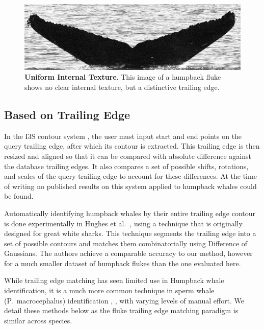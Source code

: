 \begin{figure}[t]%
\centering
\includegraphics[width=1.0\textwidth]{../images/unclear_texture.jpg}
\caption[]{\textbf{Uniform Internal Texture}. This image of a humpback fluke shows no clear internal texture, but a distinctive trailing edge.}
\label{fig:unclear_texture}
\end{figure}



\subsection{Based on Trailing Edge}

In the I3S contour system \cite{i3scontour}, the user must input start and end points on the query trailing edge, after which its contour is extracted.
This trailing edge is then resized and aligned so that it can be compared with absolute difference against the database trailing edges.
It also compares a set of possible shifts, rotations, and scales of the query trailing edge to account for these differences.
At the time of writing no published results on this system applied to humpback whales could be found.

Automatically identifying humpback whales by their entire trailing edge contour is done experimentally in Hughes et al.\ \cite{hughes2015automated}, using a technique that is originally designed for great white sharks. 
This technique segments the trailing edge into a set of possible contours and matches them combinatorially using Difference of Gaussians.
The authors achieve a comparable accuracy to our method, however for a much smaller dataset of humpback flukes than the one evaluated here.

While trailing edge matching has seen limited use in Humpback whale identification, it is a much more common technique in sperm whale (P.\ macrocephalus) identification \cite{huele2000finding}, \cite{beekmans2005comparison} \cite{whitehead1990computer}, with varying levels of manual effort.
We detail these methods below as the fluke trailing edge matching paradigm is similar across species.

